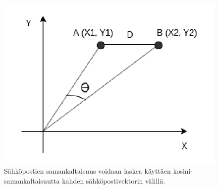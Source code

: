 \begin{figure}[ht]
  \includegraphics[scale=0.3]{figures/cosine.png}
  \caption{Sähköpostien samankaltaisuus voidaan laskea käyttäen kosini-samankaltaisuutta kahden sähköpostivektorin välillä. \citep{spamfilter}}
\end{figure}

